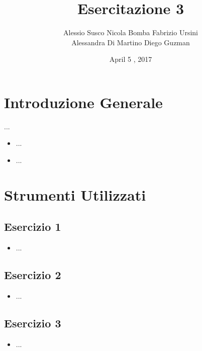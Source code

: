 \documentclass[a4paper]{article}
\begin{document}
\title{Esercitazione 3}
\date{April 5 , 2017}
\maketitle


\author{Alessio Susco \hspace*{2cm} Nicola Bomba \hspace*{2cm} Fabrizio Ursini  \\  \hspace*{1,85cm} Alessandra Di Martino \hspace*{1,25cm} Diego Guzman}

 

\tableofcontents

\clearpage

\section{Introduzione Generale}
 ...
\begin{itemize}
\item ...
\item ...
\end{itemize}

\section{Strumenti Utilizzati}

\subsection{Esercizio 1}
\begin{itemize}
\item ...
\end{itemize}

\subsection{Esercizio 2}
\begin{itemize}
\item ...
\end{itemize}

\subsection{Esercizio 3}
\begin{itemize}
\item ...
\end{itemize}
\end{document}
